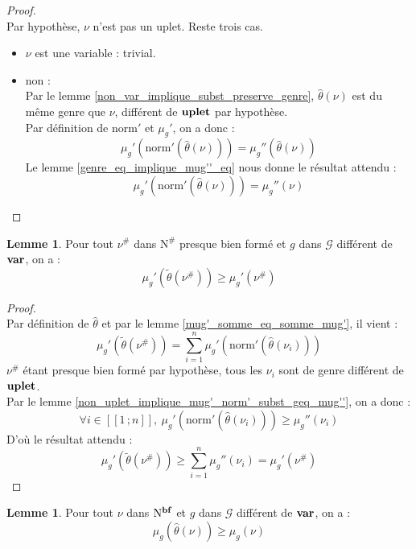 \documentclass[a4paper]{report}
\newenvironment{preuve} 
	{\begin{proof}~\\} 
	{\end{proof}}
\theoremstyle{definition}
\newtheorem{lemme}[theoreme]{Lemme}
\newcommand{\interval}[2]{[\![#1\,;#2]\!]}
\newcommand{\norm}{\mathrm{norm}}
\newcommand{\G}{\mathscr{G}}
\newcommand{\N}{\mathrm{N}}
\begin{document}
\begin{preuve}
	Par hypothèse, $\nu$ n'est pas un uplet. Reste trois cas.
	\begin{itemize}[label={\textbf{Si}}]
		\item
			$\nu$ est une variable : trivial.
		\item
			non : \\
			Par le lemme \ref{non_var_implique_subst_preserve_genre}, $\hat\theta (\nu)$ est du même genre que $\nu$, différent de $\bold{uplet}$ par hypothèse. \\
			Par définition de $\norm'$ et $\mu_g'$, on a donc :
			\[ \mu_g' (\norm' (\hat\theta (\nu))) = \mu_g'' (\hat\theta (\nu)) \]
			Le lemme \ref{genre_eq_implique_mug''_eq} nous donne le résultat attendu :
			\[ \mu_g' (\norm' (\hat\theta (\nu))) = \mu_g'' (\nu) \]
	\end{itemize}
\end{preuve}

\begin{lemme} \label{pbf_implique_mug'_subst_geq_mug'}
	Pour tout $\nu^\#$ dans $\N^\#$ presque bien formé et $g$ dans $\G$ différent de $\bold{var}$, on a :
	\[ \mu_g' (\tilde\theta (\nu^\#)) \geqslant \mu_g' (\nu^\#) \]
\end{lemme}

\begin{preuve}
	Par définition de $\hat\theta$ et par le lemme \ref{mug'_somme_eq_somme_mug'}, il vient :
	\[ \mu_g' (\tilde\theta (\nu^\#)) = \sum_{i=1}^n \mu_g' (\norm' (\hat\theta (\nu_i))) \]
	$\nu^\#$ étant presque bien formé par hypothèse, tous les $\nu_i$ sont de genre différent de $\bold{uplet}$. \\
	Par le lemme \ref{non_uplet_implique_mug'_norm'_subst_geq_mug''}, on a donc :
	\[ \forall i \in \interval 1 n,\ \mu_g' (\norm' (\hat\theta (\nu_i))) \geqslant \mu_g'' (\nu_i) \]
	D'où le résultat attendu :
	\[ \mu_g' (\tilde\theta (\nu^\#)) \geqslant \sum_{i=1}^n \mu_g'' (\nu_i) = \mu_g' (\nu^\#) \]
\end{preuve}

\begin{lemme} \label{bf_implique_mug_subst_geq_mug}
	Pour tout $\nu$ dans $\N^{\bold{bf}}$ et $g$ dans $\G$ différent de $\bold{var}$, on a :
	\[ \mu_g (\hat\theta (\nu)) \geqslant \mu_g (\nu) \]
\end{lemme}
\end{document}
